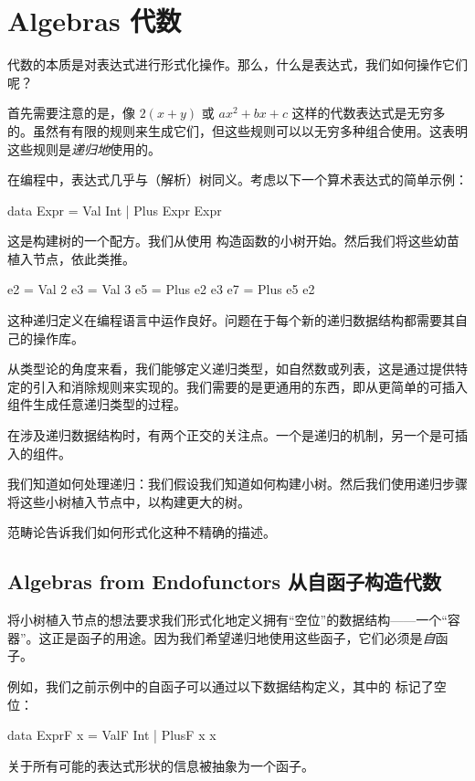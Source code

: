 \documentclass[DaoFP]{subfiles}
\begin{document}
 \setcounter{chapter}{11}

 \chapter{Algebras 代数}

 代数的本质是对表达式进行形式化操作。那么，什么是表达式，我们如何操作它们呢？

 首先需要注意的是，像 $2 (x + y)$ 或 $a x^2 + b x + c$ 这样的代数表达式是无穷多的。虽然有有限的规则来生成它们，但这些规则可以以无穷多种组合使用。这表明这些规则是\emph{递归地}使用的。

 在编程中，表达式几乎与（解析）树同义。考虑以下一个算术表达式的简单示例：
 \begin{haskell}
  data Expr = Val Int
  | Plus Expr Expr
 \end{haskell}
 这是构建树的一个配方。我们从使用  构造函数的小树开始。然后我们将这些幼苗植入节点，依此类推。
 \begin{haskell}
  e2 = Val 2
  e3 = Val 3
  e5 = Plus e2 e3
  e7 = Plus e5 e2
 \end{haskell}

 这种递归定义在编程语言中运作良好。问题在于每个新的递归数据结构都需要其自己的操作库。

 从类型论的角度来看，我们能够定义递归类型，如自然数或列表，这是通过提供特定的引入和消除规则来实现的。我们需要的是更通用的东西，即从更简单的可插入组件生成任意递归类型的过程。

 在涉及递归数据结构时，有两个正交的关注点。一个是递归的机制，另一个是可插入的组件。

 我们知道如何处理递归：我们假设我们知道如何构建小树。然后我们使用递归步骤将这些小树植入节点中，以构建更大的树。

 范畴论告诉我们如何形式化这种不精确的描述。

 \section{Algebras from Endofunctors 从自函子构造代数}

 将小树植入节点的想法要求我们形式化地定义拥有“空位”的数据结构——一个“容器”。这正是函子的用途。因为我们希望递归地使用这些函子，它们必须是\emph{自}函子。

 例如，我们之前示例中的自函子可以通过以下数据结构定义，其中的  标记了空位：
 \begin{haskell}
  data ExprF x = ValF Int
  | PlusF x x
 \end{haskell}
 关于所有可能的表达式形状的信息被抽象为一个函子。
\end{document}
